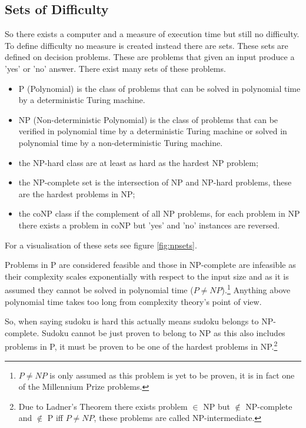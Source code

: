 \documentclass[a4paper,11pt]{report}
\begin{document}
\subsection{Sets of Difficulty} 

So there exists a computer and a measure of execution time but still no difficulty. To define difficulty no measure is created instead there are sets. These sets are defined on decision problems. These are problems that given an input produce a 'yes' or 'no' answer. There exist many sets of these problems.

\begin{itemize}
\item{P (Polynomial) is the class of problems that can be solved in polynomial time by a deterministic Turing machine.}
\item{NP (Non-deterministic Polynomial) is the class of problems that can be verified in polynomial time by a deterministic Turing machine or solved in polynomial time by a non-deterministic Turing machine.}
\item{the NP-hard class are at least as hard as the hardest NP problem;} 
\item{the NP-complete set is the intersection of NP and NP-hard problems, these are the hardest problems in NP;} 
\item{the coNP class if the complement of all NP problems, for each problem in NP there exists a problem in coNP but 'yes' and 'no' instances are reversed.}
\end{itemize}

For a visualisation of these sets see figure \ref{fig:npsets}.

Problems in P are considered feasible and those in NP-complete are infeasible as their complexity scales exponentially with respect to the input size and as it is assumed they cannot be solved in polynomial time ($P \neq NP$).\footnote{$P\neq NP$ is only assumed as this problem is yet to be proven, it is in fact one of the Millennium Prize problems.} Anything above polynomial time takes too long from complexity theory's point of view.

So, when saying sudoku is hard this actually means sudoku belongs to NP-complete. Sudoku cannot be just proven to belong to NP as this also includes problems in P, it must be proven to be one of the hardest problems in NP.\footnote{Due to Ladner's Theorem there exists problem $\in$ NP but $\not\in$ NP-complete and $\not\in$ P iff $P\neq NP$, these problems are called NP-intermediate.}
\end{document}
